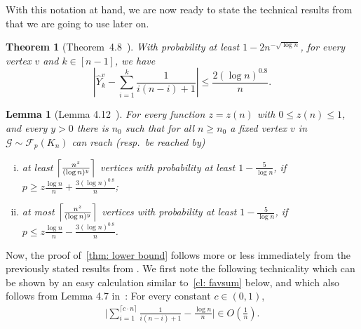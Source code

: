 \documentclass[a4paper,11pt]{article}
\theoremstyle{definition}
\theoremstyle{plain}
\newtheorem{theorem}{Theorem}
\newtheorem{lemma}{Lemma}
\newcommand{\G}{\mathcal G}
\newcommand{\F}{\mathcal F}
\newcommand{\bigO}{O} %
\DeclarePairedDelimiter\ceil{\lceil}{\rceil}
\begin{document}
With this notation at hand, we are now ready to state the technical results from \cite{CasteigtsRRZ21} that we are going to use later on.
\begin{theorem}[Theorem~4.8~\cite{CasteigtsRRZ21}]\label{thm: casteigts}
	With probability at least $1-2n^{-\sqrt{\log n}}$, for every vertex $v$ and $k\in[n-1]$, we have
	\[
	\left| \widehat{Y}_k^v - \sum_{i=1}^k \frac{1}{i(n-i)+1}\right|\le \frac{2 (\log n)^{0.8}}{n} .
	\]
\end{theorem}


\begin{lemma}[Lemma 4.12~\cite{CasteigtsRRZ21}]\label{lem: tree growth}
	For every function $z = z(n)$ with $0 \leq z(n) \leq 1$, and every $y > 0$ there is $n_0$ such that for all $n \geq n_0$
	a fixed vertex $v$ in $\G \sim \F_{p}(K_n)$
	can reach (resp.\ be reached by)
	\begin{enumerate}[(i)]
		\item \emph{at least} $\ceil*{\frac{n^z}{(\log n)^y}}$
		vertices with probability at least $1 - \frac{5}{\log{n}}$, if $p \geq z\frac{\log n}{n} + \frac{3(\log n)^{0.8}}{n}$;

		\item \emph{at most} $\ceil*{\frac{n^z}{(\log n)^y}}$
		vertices with probability at least $1 - \frac{5}{\log{n}}$, if $p \leq z\frac{\log n}{n} - \frac{3(\log n)^{0.8}}{n}$.
	\end{enumerate}
\end{lemma}


Now, the proof of~\cref{thm: lower bound} follows more or less immediately from the previously stated results from \cite{CasteigtsRRZ21}. We first note the following technicality which can be shown by an easy calculation similar to~\cref{cl: favsum} below, and which also follows from Lemma 4.7 in~\cite{CasteigtsRRZ21}: For every constant $c\in (0, 1)$,
\begin{align*}
    \Big|
        \sum_{i=1}^{\lceil c\cdot n \rceil} \frac{1}{i(n-i) + 1}
        - \frac{\log n}{n}
   \Big|
   \in \bigO\mathopen{}\left(\frac{1}{n}\right).
\end{align*}
\end{document}
